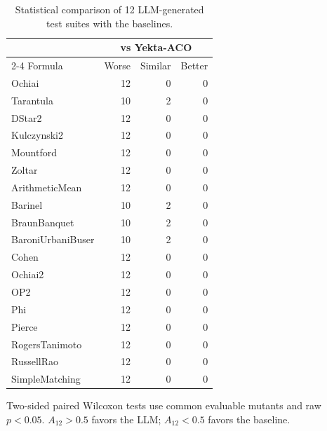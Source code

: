 \begin{table}[t]
\centering
\caption{Statistical comparison of 12 LLM-generated test suites with the baselines.}
\label{tab:rq3bw-pairwise-counts}
\begin{tabular}{lrrr}
\hline
 & \multicolumn{3}{c}{vs Yekta-ACO} \\
\cline{2-4}
Formula & Worse & Similar & Better \\
\hline
Ochiai & 12 & 0 & 0 \\
Tarantula & 10 & 2 & 0 \\
DStar2 & 12 & 0 & 0 \\
Kulczynski2 & 12 & 0 & 0 \\
Mountford & 12 & 0 & 0 \\
Zoltar & 12 & 0 & 0 \\
ArithmeticMean & 12 & 0 & 0 \\
Barinel & 10 & 2 & 0 \\
BraunBanquet & 10 & 2 & 0 \\
BaroniUrbaniBuser & 10 & 2 & 0 \\
Cohen & 12 & 0 & 0 \\
Ochiai2 & 12 & 0 & 0 \\
OP2 & 12 & 0 & 0 \\
Phi & 12 & 0 & 0 \\
Pierce & 12 & 0 & 0 \\
RogersTanimoto & 12 & 0 & 0 \\
RussellRao & 12 & 0 & 0 \\
SimpleMatching & 12 & 0 & 0 \\
\hline
\end{tabular}
\par\smallskip
\begin{minipage}{\linewidth}\footnotesize Two-sided paired Wilcoxon tests use common evaluable mutants and raw $p<0.05$. $A_{12}>0.5$ favors the LLM; $A_{12}<0.5$ favors the baseline.
\end{minipage}
\end{table}
